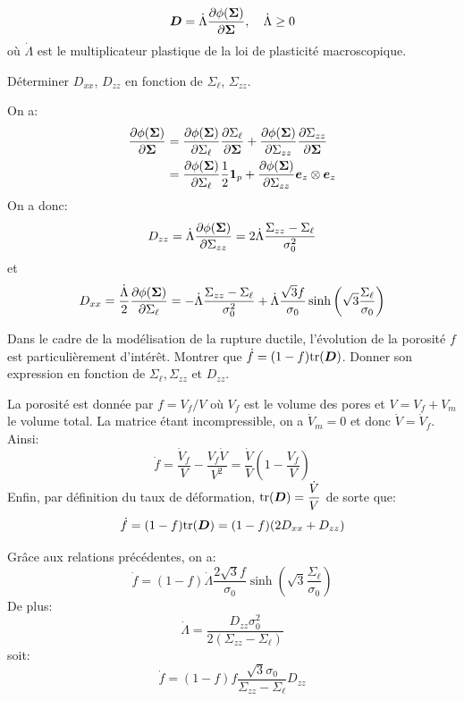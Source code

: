 \documentclass[french,english,12pt]{exam}
\begin{document}
\begin{questions}
  \begin{equation}
     \boldsymbol{D} = \dot{\Lambda} \frac{\partial \phi(\boldsymbol{\Sigma})}{\partial \boldsymbol{\Sigma}},  \quad \dot{\Lambda}\geq 0
  \end{equation}
où $\dot{\Lambda}$ est le multiplicateur plastique de la loi de plasticité macroscopique.

\question Déterminer $D_{xx}$, $D_{zz}$ en fonction de $\Sigma_\ell$, $\Sigma_{zz}$.
 \begin{solution}
 On a:
\begin{align*}
\frac{\partial \phi(\boldsymbol{\Sigma})}{\partial \boldsymbol{\Sigma}} &= \frac{\partial \phi(\boldsymbol{\Sigma})}{\partial \Sigma_\ell}\frac{\partial \Sigma_\ell}{\partial \boldsymbol{\Sigma}} + \frac{\partial \phi(\boldsymbol{\Sigma})}{\partial \Sigma_{zz}}\frac{\partial \Sigma_{zz}}{\partial \boldsymbol{\Sigma}}\\
 &= \frac{\partial \phi(\boldsymbol{\Sigma})}{\partial \Sigma_\ell}\dfrac{1}{2}\boldsymbol{1}_p + \frac{\partial \phi(\boldsymbol{\Sigma})}{\partial \Sigma_{zz}}\boldsymbol{e}_z\otimes\boldsymbol{e}_z
\end{align*}
On a donc:
 $$D_{zz} = \dot{\Lambda}\dfrac{\partial \phi(\boldsymbol{\Sigma})}{\partial \Sigma_{zz}} = 2\dot{\Lambda}\dfrac{\Sigma_{zz}-\Sigma_\ell}{\sigma_0^2}$$
et
$$D_{xx} = \dfrac{\dot{\Lambda}}{2}\dfrac{\partial \phi(\boldsymbol{\Sigma})}{\partial \Sigma_\ell} = -\dot{\Lambda}\dfrac{\Sigma_{zz}-\Sigma_\ell}{\sigma_0^2} +  \dot{\Lambda}\dfrac{\sqrt{3}f}{\sigma_0} \sinh{\left(  \sqrt{3} \frac{\Sigma_\ell}{\sigma_0} \right)} $$
 \end{solution} 


 \question Dans le cadre de la modélisation de la rupture ductile, l'évolution de la porosité $f$ est particulièrement d'intérêt. Montrer que $\dot{f} = (1 - f) \mathrm{tr} (\boldsymbol{D})$. Donner son expression en fonction de $\Sigma_\ell,\Sigma_{zz}$ et $D_{zz}$.
\begin{solution}
La porosité est donnée par $f=V_f/V$ où $V_f$ est le volume des pores et $V=V_f+V_m$ le volume total. La matrice étant incompressible, on a $\dot{V}_m=0$ et donc $\dot{V}=\dot{V}_f$. Ainsi:
$$\dot{f} = \dfrac{\dot{V}_f}{V}-\dfrac{V_f\dot{V}}{V^2} = \dfrac{\dot{V}}{V}\left(1-\dfrac{V_f}{V}\right)$$
Enfin, par définition du taux de déformation, $\mathrm{tr}( \boldsymbol{D}) =  \dfrac{\dot{V}}{V}$ de sorte que:
$$\dot{f}=(1-f)\mathrm{tr}(\boldsymbol{D}) = (1-f)(2D_{xx}+D_{zz})$$

Grâce aux relations précédentes, on a:
$$\dot{f} = (1-f)\dot{\Lambda}\dfrac{2\sqrt{3}f}{\sigma_0} \sinh{\left(  \sqrt{3} \frac{\Sigma_\ell}{\sigma_0} \right)} $$
De plus:
$$\dot{\Lambda}= \dfrac{D_{zz}\sigma_0^2}{2(\Sigma_{zz}-\Sigma_\ell)}$$
soit:
$$\dot{f} = (1-f)f\dfrac{\sqrt{3}\sigma_0}{\Sigma_{zz}-\Sigma_\ell}D_{zz}$$
\end{solution}



\end{questions}
\end{document}
